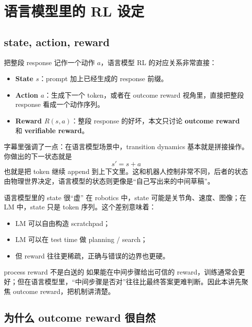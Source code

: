 \section{语言模型里的 RL 设定}

\subsection{state, action, reward}

把整段 response 记作一个动作 $a$，语言模型 RL 的对应关系非常直接：
\begin{itemize}
    \item \textbf{State $s$}：prompt 加上已经生成的 response 前缀。
    \item \textbf{Action $a$}：生成下一个 token，或者在 outcome reward 视角里，直接把整段 response 看成一个动作序列。
    \item \textbf{Reward $R(s,a)$}：整段 response 的好坏，本文只讨论 \textbf{outcome reward} 和 \textbf{verifiable reward}。
\end{itemize}

字幕里强调了一点：在语言模型场景中，transition dynamics 基本就是拼接操作。你做出的下一状态就是
\[
s' = s + a
\]
也就是把 token 继续 append 到上下文里。这和机器人控制非常不同，后者的状态由物理世界决定，语言模型的状态则更像是“自己写出来的中间草稿”。

\begin{knowledgebox}{语言模型里的 state 很“虚”}
在 robotics 中，state 可能是关节角、速度、图像；在 LM 中，state 只是 token 序列。这个差别意味着：
\begin{itemize}
    \item LM 可以自由构造 scratchpad；
    \item LM 可以在 test time 做 planning / search；
    \item 但 reward 往往更稀疏，正确与错误的边界也更硬。
\end{itemize}
\end{knowledgebox}


\begin{warningbox}{process reward 不是白送的}
如果能在中间步骤给出可信的 reward，训练通常会更好；但在语言模型里，“中间步骤是否对”往往比最终答案更难判断。因此本讲先聚焦 outcome reward，把机制讲清楚。
\end{warningbox}

\subsection{为什么 outcome reward 很自然}

